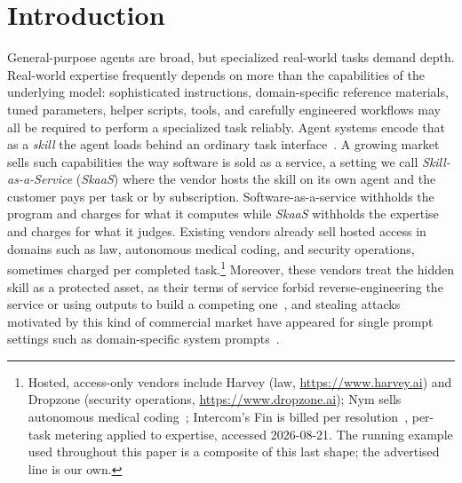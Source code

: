 \documentclass[letterpaper,twocolumn,10pt]{article}
\begin{document}
\section{Introduction}
\label{sec:intro}

General-purpose agents are broad, but specialized real-world tasks demand depth.
Real-world expertise frequently depends on more than the capabilities of the underlying model: 
sophisticated instructions, domain-specific reference materials, 
tuned parameters, helper scripts, tools, and carefully 
engineered workflows may all be required to perform a specialized task reliably. 
Agent systems encode that as a \emph{skill} the agent loads behind an ordinary task
interface~\cite{agentskills, openaiskills}. A growing market sells such capabilities the way software is sold as a
service, a setting we call \emph{Skill-as-a-Service} (\textit{SkaaS}) where the vendor hosts the skill
on its own agent and the customer pays per task or by subscription. 
Software-as-a-service withholds the program and charges for what
it computes while \textit{SkaaS} withholds the expertise and charges for what it
judges.  Existing vendors already sell hosted access in domains such as law, autonomous medical coding, and security operations,
sometimes charged per completed task.\footnote{Hosted, access-only vendors include Harvey
(law, \url{https://www.harvey.ai}) and Dropzone (security operations,
\url{https://www.dropzone.ai}); Nym sells autonomous
medical coding~\cite{nym}; Intercom's Fin is billed per
resolution~\cite{intercomfin}, per-task metering applied to expertise, accessed
2026-08-21.  The running example used throughout this paper is a composite of
this last shape; the advertised line is our own.}  Moreover, these
vendors treat the hidden skill as a protected asset, as their terms of
service forbid reverse-engineering the service or using outputs to build a
competing one~\cite{anthropicterms, geminiterms, harveyterms}, and stealing
attacks motivated by this kind of commercial market have appeared for single prompt settings 
such as domain-specific system prompts~\cite{shen2024prompt, yang2025prsa}. 
\end{document}
